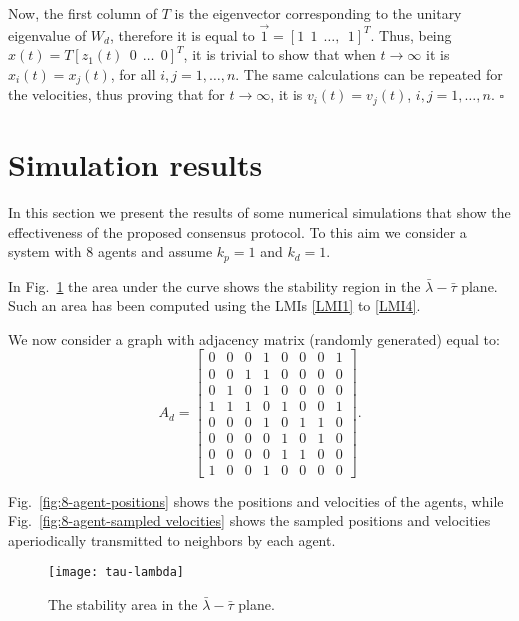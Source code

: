 \documentclass[conference]{IEEEtran}
\begin{document}
Now, the first column of $T$ is the eigenvector corresponding to the unitary eigenvalue of $W_d$, therefore it is equal to $\vec 1=[1\ \ 1\ \ \ldots,\ \ 1 ]^T$. Thus, being $x(t)=T [z_1(t) \ \ 0 \ \ \ldots \ \ 0]^T$, it is trivial to show that when $t \to \infty$ it is $x_i(t)=x_j(t)$, for all $i,j=1,\ldots, n$.
The same calculations can be repeated for the velocities, thus proving that for $t \to \infty$, it is $v_i(t)=v_j(t)$, $i,j=1,\ldots, n $. \hfill $\square$




\section{Simulation results}\label{sim_res}

In this section we present the results of some numerical simulations that show the effectiveness of the proposed consensus protocol.
To this aim we consider a system with $8$ agents and assume $k_p=1$ and $k_d=1$.

In Fig.~\ref{fig:tau-lambda} the area under the curve shows the stability region in the $\bar\lambda-\bar\tau$ plane. Such an area has been computed using the LMIs \eqref{LMI1} to \eqref{LMI4}.

We now consider a graph with adjacency matrix (randomly generated) equal to:
\begin{equation}
A_d=\left[\begin{array}{cccccccc}
 0 & 0 & 0 & 1 & 0 & 0 & 0 & 1 \\
 0 & 0 & 1 & 1 & 0 & 0 & 0 & 0 \\
 0 & 1 & 0 & 1 & 0 & 0 & 0 & 0 \\
 1 & 1 & 1 & 0 & 1 & 0 & 0 & 1 \\
 0 & 0 & 0 & 1 & 0 & 1 & 1 & 0 \\
 0 & 0 & 0 & 0 & 1 & 0 & 1 & 0 \\
 0 & 0 & 0 & 0 & 1 & 1 & 0 & 0 \\
 1 & 0 & 0 & 1 & 0 & 0 & 0 & 0
\end{array} \right].
\end{equation}

Fig.~\ref{fig:8-agent-positions} shows the positions and velocities of the agents, while Fig.~\ref{fig:8-agent-sampled velocities} shows the sampled positions and velocities aperiodically transmitted to neighbors by each agent.

\begin{figure}
\centering
\texttt{[image: tau-lambda]}
\caption{The stability area in the $\bar\lambda-\bar\tau$ plane.}
\label{fig:tau-lambda}
\end{figure}
\end{document}
